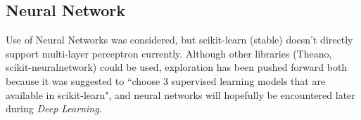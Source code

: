 \documentclass{article}
\begin{document}
	\subsection{Neural Network}
	Use of Neural Networks was considered, but scikit-learn (stable) doesn't directly support multi-layer perceptron currently. Although other libraries (Theano, scikit-neuralnetwork) could be used, exploration has been pushed forward both because it was suggested to ``choose 3 supervised learning models that are available in scikit-learn", and neural networks will hopefully be encountered later during \emph{Deep Learning}.
	
	
	
\end{document}
